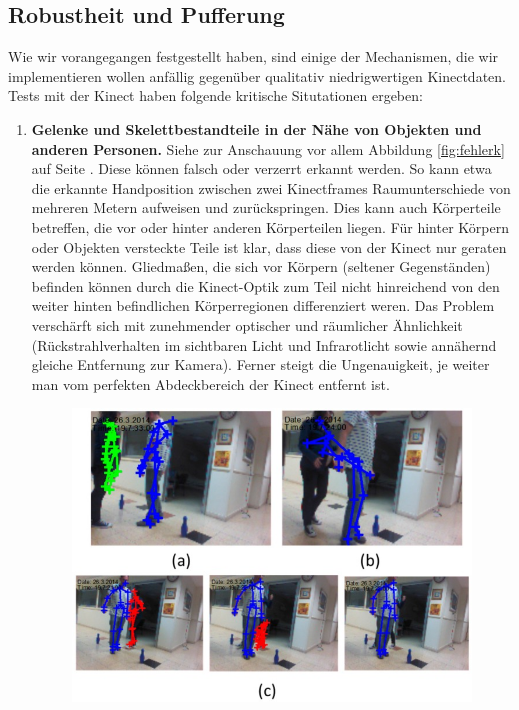 	\subsection{Robustheit und Pufferung}\label{sec:robustheit}
	Wie wir vorangegangen festgestellt haben, sind einige der Mechanismen, die wir implementieren wollen anfällig gegenüber qualitativ niedrigwertigen Kinectdaten. Tests mit der Kinect haben folgende kritische Situtationen ergeben:
	\begin{enumerate}[label=(\roman*)]
		\item\label{itm:problem1} \textbf{Gelenke und Skelettbestandteile in der Nähe von Objekten und anderen Personen.} Siehe zur Anschauung vor allem Abbildung \ref{fig:fehlerk} auf Seite \pageref{fig:fehlerk}. Diese können falsch oder verzerrt erkannt werden. So kann etwa die erkannte Handposition zwischen zwei Kinectframes Raumunterschiede von mehreren Metern aufweisen und zurückspringen. Dies kann auch Körperteile betreffen, die vor oder hinter anderen Körperteilen liegen. Für hinter Körpern oder Objekten versteckte Teile ist klar, dass diese von der Kinect nur geraten werden können. Gliedmaßen, die sich vor Körpern (seltener Gegenständen) befinden können durch die Kinect-Optik zum Teil nicht hinreichend von den weiter hinten befindlichen Körperregionen differenziert weren. Das Problem verschärft sich mit zunehmender optischer und räumlicher Ähnlichkeit (Rückstrahlverhalten im sichtbaren Licht und Infrarotlicht sowie annähernd gleiche Entfernung zur Kamera). Ferner steigt die Ungenauigkeit, je weiter man vom \glqq perfekten Abdeckbereich\grqq{} der Kinect entfernt ist.\par \begin{figure}
\includegraphics[width=\textwidth]{pictures/sensors-16-01965-g006.jpg}

\end{figure}
\end{enumerate}
